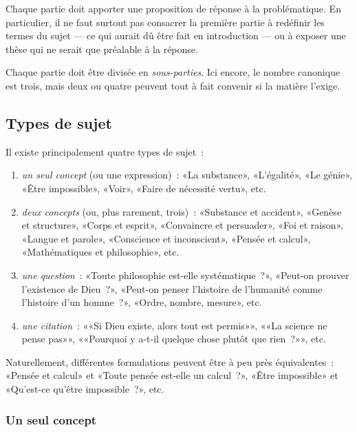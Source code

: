 \documentclass[a4paper,11pt]{article}
\begin{document}
\par

Chaque partie doit apporter une proposition de réponse à la
problématique. En particulier, il ne faut surtout pas consacrer la
première partie à redéfinir les termes du sujet --- ce qui aurait dû
être fait en introduction --- ou à exposer une thèse qui ne serait que
préalable à la réponse.

\par

Chaque partie doit être divisée en \emph{sous-parties}. Ici encore, le
nombre canonique est trois, mais deux ou quatre peuvent tout à fait
convenir si la matière l'exige.



\subsection{Types de sujet}

Il existe principalement quatre types de sujet~: 
\begin{enumerate}
\item \emph{un seul concept} (ou une expression)~: «La substance»,
  «L'égalité», «Le génie», «Être impossible», «Voir», «Faire de
  nécessité vertu», etc.
\item \emph{deux concepts} (ou, plus rarement, trois)~: «Substance et
  accident», «Genèse et structure», «Corps et esprit», «Convaincre et
  persuader», «Foi et raison», «Langue et parole», «Conscience et
  inconscient», «Pensée et calcul», «Mathématiques et philosophie», etc.
\item \emph{une question}~: «Toute philosophie est-elle systématique~?»,
  «Peut-on prouver l'existence de Dieu~?», «Peut-on penser l'histoire de
  l'humanité comme l'histoire d'un homme~?», «Ordre, nombre, mesure»,
  etc.
\item \emph{une citation}~: ««Si Dieu existe, alors tout est permis»»,
  ««La science ne pense pas»», ««Pourquoi y a-t-il quelque chose plutôt
  que rien~?»», etc.
\end{enumerate}
Naturellement, différentes formulations peuvent être à peu près
équivalentes~: «Pensée et calcul» et «Toute pensée est-elle un
calcul~?», «Être impossible» et «Qu'est-ce qu'être impossible~?», etc.



\subsubsection{Un seul concept}
\end{document}
